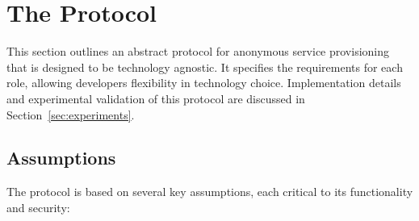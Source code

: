 \documentclass[pdftex,twocolumn,epjc3]{svjour3}
\begin{document}
\section{The Protocol}\label{sec:protocol}
This section outlines an abstract protocol for anonymous service provisioning that is designed to be technology agnostic. It specifies the requirements for each role, allowing developers flexibility in technology choice. Implementation details and experimental validation of this protocol are discussed in Section~\ref{sec:experiments}.

\subsection{Assumptions}
The protocol is based on several key assumptions, each critical to its functionality and security:
\end{document}
